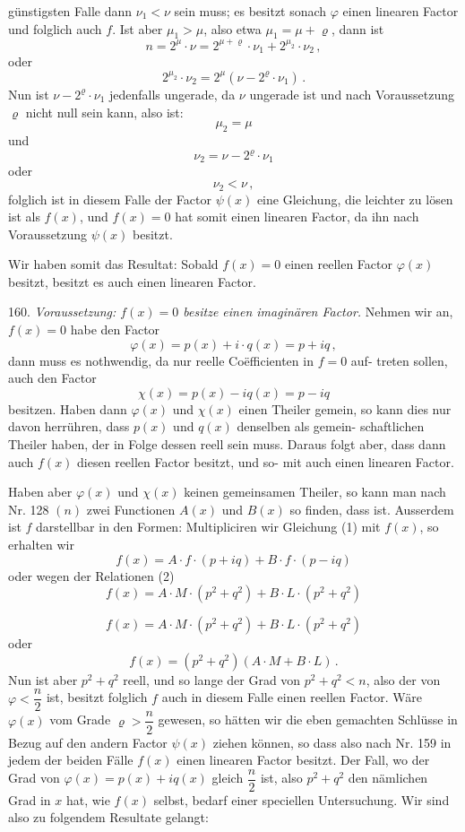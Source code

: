 günstigsten Falle dann $\nu_1<\nu$ sein muss; es besitzt sonach $\varphi$ einen
linearen Factor und folglich auch $f$. Ist aber $\mu_1>\mu$, also etwa $\mu_1=\mu+\varrho$,
dann ist
\[ n = 2^{\mu}\cdot \nu = 2^{\mu+\varrho}\cdot \nu_1 + 2^{\mu_2}\cdot \nu_2\, , \]
oder
\[ 2^{\mu_2}\cdot \nu_2 = 2^{\mu}(\nu-2^{\varrho}\cdot \nu_1)\, . \]
Nun ist $\nu-2^{\varrho}\cdot \nu_1$ jedenfalls ungerade, da $\nu$ ungerade ist und nach
Voraussetzung $\varrho$ nicht null sein kann, also ist:
\[ \mu_2=\mu \]
und
\[ \nu_2=\nu-2^{\varrho}\cdot \nu_1 \]
oder
\[ \nu_2<\nu\, , \]
folglich ist in diesem Falle der Factor $\psi(x)$ eine Gleichung, die leichter
zu lösen ist als $f(x)$, und $f(x)=0$ hat somit einen linearen Factor,
da ihn nach Voraussetzung $\psi(x)$ besitzt.

Wir haben somit das Resultat: Sobald $f(x)=0$ einen reellen
Factor $\varphi(x)$ besitzt, besitzt es auch einen linearen Factor.

160. \emph{Voraussetzung: $f(x)=0$ besitze einen imaginären Factor.}
Nehmen wir an, $f(x)=0$ habe den Factor
\[ \varphi(x) = p(x)+i\cdot q(x) = p+iq\, , \]
dann muss es nothwendig, da nur reelle Co\"efficienten in $f=0$ auf-
treten sollen, auch den Factor
\[ \chi(x) = p(x)-iq(x) = p-iq \]
besitzen. Haben dann $\varphi(x)$ und $\chi(x)$ einen Theiler gemein, so kann
dies nur davon herrühren, dass $p(x)$ und $q(x)$ denselben als gemein-
schaftlichen Theiler haben, der in Folge dessen reell sein muss. Daraus
folgt aber, dass dann auch $f(x)$ diesen reellen Factor besitzt, und so-
mit auch einen linearen Factor.

Haben aber $\varphi(x)$ und $\chi(x)$ keinen gemeinsamen Theiler, so kann
man nach Nr. 128 $(n)$ zwei Functionen $A(x)$ und $B(x)$ so finden, dass
ist. Ausserdem ist $f$ darstellbar in den Formen:
Multipliciren wir Gleichung (1) mit $f(x)$, so erhalten wir
\[ f(x) = A\cdot f\cdot(p+iq) + B\cdot f\cdot(p-iq) \]
oder wegen der Relationen (2)
\[ f(x) = A\cdot M\cdot(p^2+q^2) + B\cdot L\cdot(p^2+q^2) \]


\[ f(x) = A\cdot M\cdot(p^2+q^2) + B\cdot L\cdot(p^2+q^2) \]
oder
\[ f(x) = (p^2+q^2)(A\cdot M + B\cdot L)\, . \]
Nun ist aber $p^2+q^2$ reell, und so lange der Grad von $p^2+q^2<n$,
also der von $\varphi<\dfrac{n}{2}$ ist, besitzt folglich $f$ auch in diesem Falle einen
reellen Factor. Wäre $\varphi(x)$ vom Grade $\varrho>\dfrac{n}{2}$ gewesen, so hätten wir
die eben gemachten Schlüsse in Bezug auf den andern Factor $\psi(x)$
ziehen können, so dass also nach Nr. 159 in jedem der beiden Fälle
$f(x)$ einen linearen Factor besitzt. Der Fall, wo der Grad von
$\varphi(x)=p(x)+iq(x)$ gleich $\dfrac{n}{2}$ ist, also $p^2+q^2$ den nämlichen Grad
in $x$ hat, wie $f(x)$ selbst, bedarf einer speciellen Untersuchung. Wir
sind also zu folgendem Resultate gelangt:

